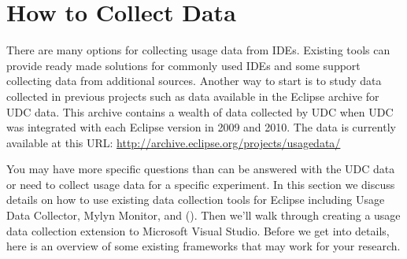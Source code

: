\section{How to Collect Data}
\label{SecHowToCollectData}

There are many options for collecting usage data from IDEs.   Existing tools can provide ready made solutions for commonly used IDEs and some support collecting data from additional sources.   Another way to start is to study data collected in previous projects such as data available in the Eclipse archive for UDC data.  This archive contains a wealth of data collected by UDC when UDC was integrated with each Eclipse version in 2009 and 2010.  The data is currently available at this URL:
\url{http://archive.eclipse.org/projects/usagedata/}

You may have more specific questions than can be answered with the UDC data or need to collect usage data for a specific experiment.  In this section we discuss details on how to use existing data collection tools for Eclipse including Usage Data Collector, Mylyn Monitor, and \CodingSpectator{} ().  Then we'll walk through creating a usage data collection extension to Microsoft Visual Studio.  Before we get into details, here is an overview of some existing frameworks that may work for your research.

